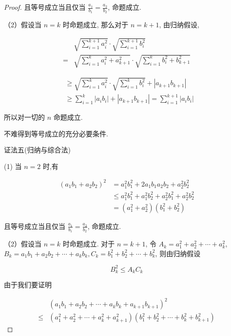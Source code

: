 \begin{proof}
	且等号成立当且仅当 $\frac{a_{1}}{b_{1}}=\frac{a_{2}}{b_{2}}$, 命题成立.
	
	（2）假设当 $n=k$ 时命题成立, 那么对于 $n=k+1$, 由归纳假设,
	
	$$
	\begin{aligned}
	& \sqrt{\sum_{i=1}^{k+1} a_{i}^{2}} \cdot \sqrt{\sum_{i=1}^{k+1} b_{i}^{2}} \\
	= & \sqrt{\sum_{i=1}^{k} a_{i}^{2}+a_{k+1}^{2}} \cdot \sqrt{\sum_{i=1}^{k} b_{i}^{2}+b_{k+1}^{2}}
	\end{aligned}
	$$
	
	$$
	\begin{aligned}
	& \geqslant \sqrt{\sum_{i=1}^{k} a_{i}^{2}} \cdot \sqrt{\sum_{i=1}^{k} b_{i}^{2}}+\left|a_{k+1} b_{k+1}\right| \\
	& \geqslant \sum_{i=1}^{k}\left|a_{i} b_{i}\right|+\left|a_{k+1} b_{k+1}\right|=\sum_{i=1}^{k+1}\left|a_{i} b_{i}\right|
	\end{aligned}
	$$
	
	所以对一切的 $n$ 命题成立.
	
	不难得到等号成立的充分必要条件.
	
	证法五(归纳与综合法)
	
	(1) 当 $n=2$ 时,有
	
	$$
	\begin{aligned}
	\left(a_{1} b_{1}+a_{2} b_{2}\right)^{2} & =a_{1}^{2} b_{1}^{2}+2 a_{1} b_{1} a_{2} b_{2}+a_{2}^{2} b_{2}^{2} \\
	& \leqslant a_{1}^{2} b_{1}^{2}+a_{1}^{2} b_{2}^{2}+a_{2}^{2} b_{1}^{2}+a_{2}^{2} b_{2}^{2} \\
	& =\left(a_{1}^{2}+a_{2}^{2}\right)\left(b_{1}^{2}+b_{2}^{2}\right)
	\end{aligned}
	$$
	
	且等号成立当且仅当 $\frac{a_{1}}{b_{1}}=\frac{a_{2}}{b_{2}}$, 命题成立.
	
	（2）假设当 $n=k$ 时命题成立. 对于 $n=k+1$, 令 $A_{k}=a_{1}^{2}+a_{2}^{2}+\cdots+a_{k}^{2}$, $B_{k}=a_{1} b_{1}+a_{2} b_{2}+\cdots+a_{k} b_{k}, C_{k}=b_{1}^{2}+b_{2}^{2}+\cdots+b_{k}^{2}$, 则由归纳假设
	
	$$
	B_{k}^{2} \leqslant A_{k} C_{k}
	$$
	
	由于我们要证明
	
	$$
	\begin{aligned}
	& \left(a_{1} b_{1}+a_{2} b_{2}+\cdots+a_{k} b_{k}+a_{k+1} b_{k+1}\right)^{2} \\
	\leqslant & \left(a_{1}^{2}+a_{2}^{2}+\cdots+a_{k}^{2}+a_{k+1}^{2}\right)\left(b_{1}^{2}+b_{2}^{2}+\cdots+b_{k}^{2}+b_{k+1}^{2}\right)
	\end{aligned}
	$$
	

\end{proof}
